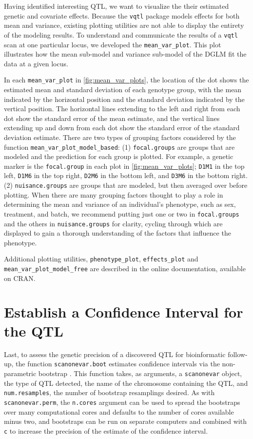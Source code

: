 \documentclass[9pt,twocolumn,twoside]{gsag3jnl}
\begin{document}
Having identified interesting QTL, we want to visualize the their estimated genetic and covariate effects.
Because the \texttt{vqtl} package models effects for both mean and variance, existing plotting utilities are not able to display the entirety of the modeling results.
To understand and communicate the results of a \texttt{vqtl} scan at one particular locus, we developed the \texttt{mean\_var\_plot}.
This plot illustrates how the mean sub-model and variance sub-model of the DGLM fit the data at a given locus.

In each \texttt{mean\_var\_plot} in \autoref{fig:mean_var_plots}, the location of the dot shows the estimated mean and standard deviation of each genotype group, with the mean indicated by the horizontal position and the standard deviation indicated by the vertical position.
The horizontal lines extending to the left and right from each dot show the standard error of the mean estimate, and the vertical lines extending up and down from each dot show the standard error of the standard deviation estimate.
There are two types of grouping factors considered by the function \texttt{mean\_var\_plot\_model\_based}:
(1) \texttt{focal.groups} are groups that are modeled and the prediction for each group is plotted.
For example, a genetic marker is the \texttt{focal.group} in each plot in \autoref{fig:mean_var_plots}; \texttt{D1M1} in the top left, \texttt{D1M6} in the top right, \texttt{D2M6} in the bottom left, and \texttt{D3M6} in the bottom right.
(2) \texttt{nuisance.groups} are groups that are modeled, but then averaged over before plotting.
When there are many grouping factors thought to play a role in determining the mean and variance of an individual's phenotype, such as sex, treatment, and batch, we recommend putting just one or two in \texttt{focal.groups} and the others in \texttt{nuisance.groups} for clarity, cycling through which are displayed to gain a thorough understanding of the factors that influence the phenotype.

Additional plotting utilities, \texttt{phenotype\_plot}, \texttt{effects\_plot} and \texttt{mean\_var\_plot\_model\_free} are described in the online documentation, available on CRAN.

\section{Establish a Confidence Interval for the QTL}

Last, to assess the genetic precision of a discovered QTL for bioinformatic follow-up, the function \texttt{scanonevar.boot} estimates confidence intervals via the non-parametric bootstrap \citep{Visscher1996}.
This function takes, as arguments, a \texttt{scanonevar} object, the type of QTL detected, the name of the chromosome containing the QTL, and \texttt{num.resamples}, the number of bootstrap resamplings desired.
As with \texttt{scanonevar.perm}, the \texttt{n.cores} argument can be used to spread the bootstraps over many computational cores and defaults to the number of cores available minus two, and bootstraps can be run on separate computers and combined with \texttt{c} to increase the precision of the estimate of the confidence interval.
\end{document}
